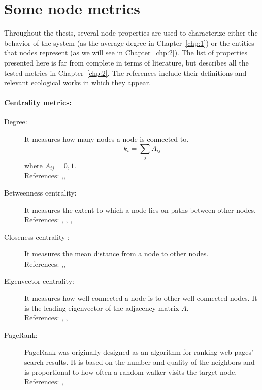 \chapter{Some node metrics}\label{chp:methods:predictors}
Throughout the thesis, several node properties are used to characterize either the behavior of the system (as the average degree in Chapter~\ref{chp:1}) or the entities that nodes represent (as we will see in Chapter~\ref{chp:2}). The list of properties presented here is far from complete in terms of literature, but describes all the tested metrics in Chapter~\ref{chp:2}. The references include their definitions and relevant ecological works in which they appear. 
\subsubsection{Centrality metrics:}
\begin{description}
 \item[Degree:]  It measures how many nodes a node is connected to. 
   \begin{equation}
   k_i = \sum_j A_{ij}
   \end{equation}
   where $A_{ij} = {0,1}$.  \\
   References: \cite{Newman2010},\cite{Gouveia2021},\cite{Jordan2008IdentifyingNetworks}  
   \item[Betweenness centrality:] It measures the extent to which a node lies on paths between other nodes. \\
   References:    \cite{Newman2010} , \cite{Estrada2007CharacterizationSpecies}, \cite{Gouveia2021}, \cite{Jordan2008IdentifyingNetworks} \item[ Closeness centrality :]  It measures the mean distance
from a node to other nodes.   \\
   References:  \cite{Newman2010} ,\cite{Gouveia2021},\cite{Jordan2008IdentifyingNetworks}
\item[Eigenvector centrality:]  It measures how well-connected a node is to other well-connected nodes. It is the
leading eigenvector of the adjacency matrix $A$.  \\
   References:   \cite{Newman2010}, \cite{Allesina2009GooglingCoextinctions} ,\cite{Estrada2007CharacterizationSpecies} 

\item[PageRank:] 
   PageRank was originally designed as an algorithm for ranking web pages' search results. It is based on the number and quality of the neighbors and is proportional to how often a random walker visits the target node.\\
   References:   \cite{Langville2006ARetrieval}, \cite{McDonald-Madden2016UsingEcosystems}  

 \end{description}

